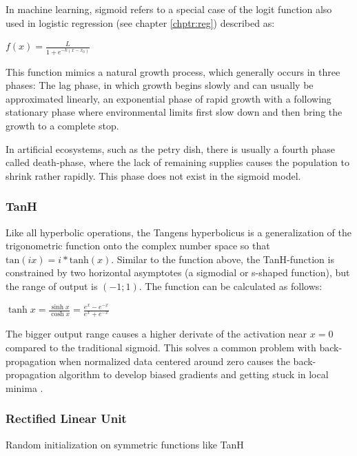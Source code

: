 In machine learning, sigmoid refers to a special case of the logit function also used in logistic regression (see chapter \ref{chptr:reg}) described as:

{\centering
	$\displaystyle f(x)={\frac {L}{1+e^{-k(x-x_{0})}}}$\par
}

This function mimics a natural growth process, which generally occurs in three phases: The lag phase, in which growth begins slowly and can usually be approximated linearly, an exponential phase of rapid growth with a following stationary phase where environmental limits first slow  down and then bring the growth to a complete stop.

In artificial ecosystems, such as the petry dish, there is usually a fourth phase called death-phase, where the lack of remaining supplies causes the population to shrink rather rapidly. This phase does not exist in the sigmoid model. 




\subsubsection{TanH}

Like all hyperbolic operations, the Tangens hyperbolicus is a generalization of the trigonometric function onto the complex number space so that $\text{tan}(ix) = i * \text{tanh}(x)$. Similar to the  function above, the TanH-function is constrained by two horizontal asymptotes (a sigmodial or s-shaped function), but the range of output is $(-1; 1)$. The function can be calculated as follows:

{\centering
$\displaystyle \tanh x={\frac {\sinh x}{\cosh x}}={\frac {e^{x}-e^{-x}}{e^{x}+e^{-x}}}$
\par
}

The bigger output range causes a higher derivate of the activation near  $x=0$ compared to the traditional sigmoid. This solves a common problem with back-propagation when normalized data centered around zero causes the back-propagation algorithm to develop biased gradients and getting stuck in local minima \cite{LeCun1998}.


\subsubsection{Rectified Linear Unit}
Random initialization on symmetric functions like TanH \cite{Hahnloser:2000aa}

